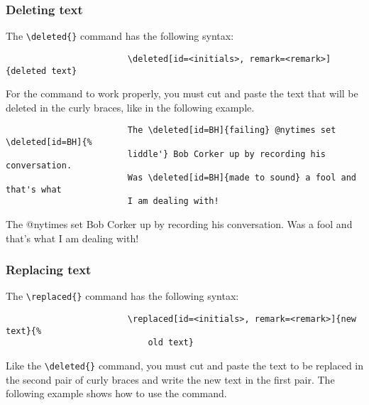 \documentclass[english]{article}
\newcommand{\cmd}[1]{%
	\texttt{\textbackslash#1\{\}}
}
\begin{document}
			\subsubsection{Deleting text}
			
				The \cmd{deleted} command has the following syntax:
				
				\begin{shaded*}
					\begin{verbatim}
						\deleted[id=<initials>, remark=<remark>]{deleted text}
					\end{verbatim}
				\end{shaded*}
			
				For the command to work properly, you must cut and paste the text that will be deleted
				in the curly braces, like in the following example.
				
				\begin{shaded*}
					\begin{verbatim}
						The \deleted[id=BH]{failing} @nytimes set \deleted[id=BH]{%
						liddle'} Bob Corker up by recording his conversation. 
						Was \deleted[id=BH]{made to sound} a fool and that's what 
						I am dealing with!
					\end{verbatim}
				\end{shaded*}
			
				\begin{leftbar}
					The  @nytimes set  Bob Corker 
					up by recording his conversation. 
					Was  a fool and that's what 
					I am dealing with!
				\end{leftbar}
			
			\subsubsection{Replacing text}
			
				The \cmd{replaced} command has the following syntax:
				
				\begin{shaded*}
					\begin{verbatim}
						\replaced[id=<initials>, remark=<remark>]{new text}{%
						    old text}
					\end{verbatim}
				\end{shaded*}
			
				Like the \cmd{deleted} command, you must cut and paste the text to be replaced in
				the second pair of curly braces and write the new text in the first pair. The
				following example shows how to use the command.
				
\end{document}
